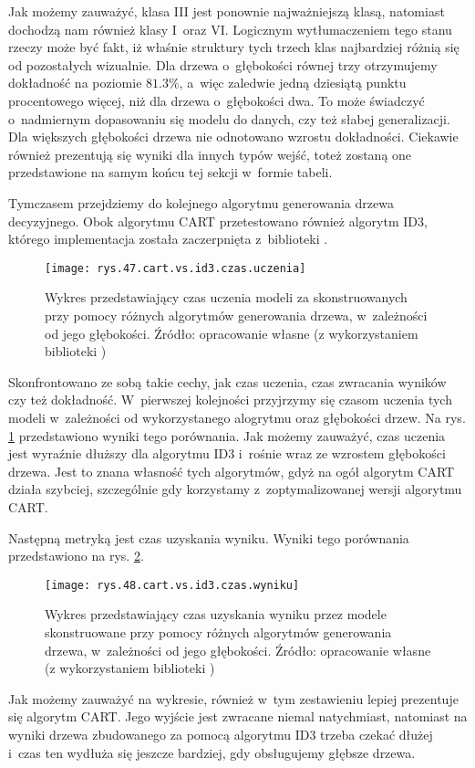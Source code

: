 Jak możemy zauważyć, klasa III jest ponownie najważniejszą klasą, natomiast dochodzą nam również klasy I~oraz VI. Logicznym wytłumaczeniem tego stanu rzeczy może być fakt, iż właśnie struktury tych trzech klas najbardziej różnią się od pozostałych wizualnie. Dla drzewa o~głębokości równej trzy otrzymujemy dokładność na poziomie $81.3\%$, a~więc zaledwie jedną dziesiątą punktu procentowego więcej, niż dla drzewa o~głębokości dwa. To może świadczyć o~nadmiernym dopasowaniu się modelu do danych, czy też słabej generalizacji. Dla większych głębokości drzewa nie odnotowano wzrostu dokładności. Ciekawie również prezentują się wyniki dla innych typów wejść, toteż zostaną one przedstawione na samym końcu tej sekcji w~formie tabeli. 

Tymczasem przejdziemy do kolejnego algorytmu generowania drzewa decyzyjnego. Obok algorytmu CART przetestowano również algorytm ID3, którego implementacja została zaczerpnięta z~biblioteki . 
\begin{figure}[h]
    \centering
    \texttt{[image: rys.47.cart.vs.id3.czas.uczenia]}
    \caption{Wykres przedstawiający czas uczenia modeli za skonstruowanych przy pomocy różnych algorytmów generowania drzewa, w~zależności od jego głębokości. Źródło: opracowanie własne (z wykorzystaniem biblioteki )}
    \label{rys.47.cart.vs.id3.czas.uczenia}
\end{figure}
Skonfrontowano ze sobą takie cechy, jak czas uczenia, czas zwracania wyników czy też dokładność. W~pierwszej kolejności przyjrzymy się czasom uczenia tych modeli w~zależności od wykorzystanego alogrytmu oraz głębokości drzew. Na rys. \ref{rys.47.cart.vs.id3.czas.uczenia} przedstawiono wyniki tego porównania.
Jak możemy zauważyć, czas uczenia jest wyraźnie dłuższy dla algorytmu ID3 i~rośnie wraz ze wzrostem głębokości drzewa. Jest to znana własność tych algorytmów, gdyż na ogół algorytm CART działa szybciej, szczególnie gdy korzystamy z~zoptymalizowanej wersji algorytmu CART. 

Następną metryką jest czas uzyskania wyniku. Wyniki tego porównania przedstawiono na rys. \ref{rys.48.cart.vs.id3.czas.wyniku}. 
\begin{figure}[h]
    \centering
    \texttt{[image: rys.48.cart.vs.id3.czas.wyniku]}
    \caption{Wykres przedstawiający czas uzyskania wyniku przez modele skonstruowane przy pomocy różnych algorytmów generowania drzewa, w~zależności od jego głębokości. Źródło: opracowanie własne (z wykorzystaniem biblioteki )}
    \label{rys.48.cart.vs.id3.czas.wyniku}
\end{figure}
Jak możemy zauważyć na wykresie, również w~tym zestawieniu lepiej prezentuje się algorytm CART. Jego wyjście jest zwracane niemal natychmiast, natomiast na wyniki drzewa zbudowanego za pomocą algorytmu ID3 trzeba czekać dłużej i~czas ten wydłuża się jeszcze bardziej, gdy obsługujemy głębsze drzewa. 


